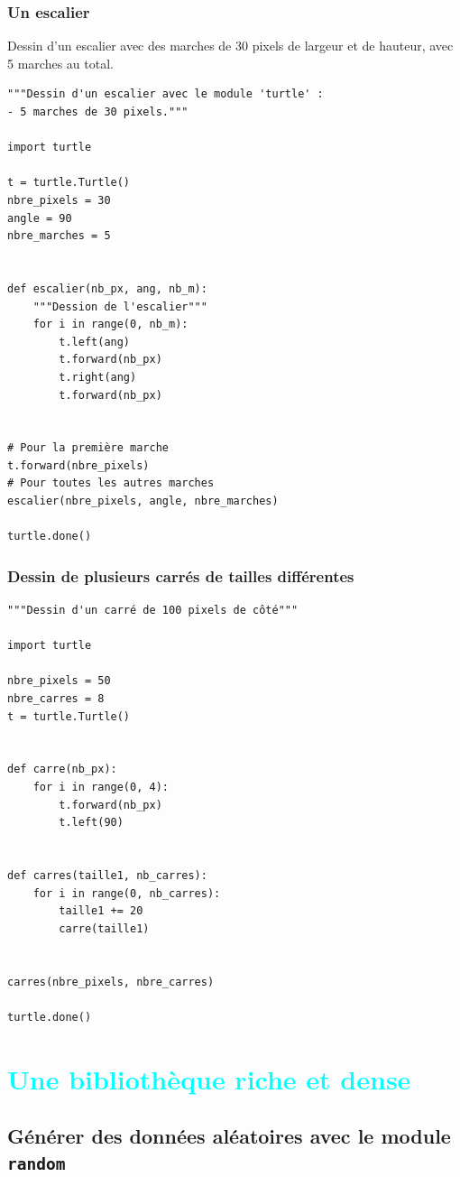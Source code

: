 \documentclass[a4paper,12pt]{book}
\begin{document}
\section{Un escalier}
Dessin d'un escalier avec des marches de 30 pixels de largeur et de hauteur, avec 5 marches au total.
\begin{lstlisting}
"""Dessin d'un escalier avec le module 'turtle' :
- 5 marches de 30 pixels."""

import turtle

t = turtle.Turtle()
nbre_pixels = 30
angle = 90
nbre_marches = 5


def escalier(nb_px, ang, nb_m):
    """Dession de l'escalier"""
    for i in range(0, nb_m):
        t.left(ang)
        t.forward(nb_px)
        t.right(ang)
        t.forward(nb_px)


# Pour la première marche
t.forward(nbre_pixels)
# Pour toutes les autres marches
escalier(nbre_pixels, angle, nbre_marches)

turtle.done()
\end{lstlisting}
\medskip

\section{Dessin de plusieurs carrés de tailles différentes}
\begin{lstlisting}
"""Dessin d'un carré de 100 pixels de côté"""

import turtle

nbre_pixels = 50
nbre_carres = 8
t = turtle.Turtle()


def carre(nb_px):
    for i in range(0, 4):
        t.forward(nb_px)
        t.left(90)


def carres(taille1, nb_carres):
    for i in range(0, nb_carres):
        taille1 += 20
        carre(taille1)


carres(nbre_pixels, nbre_carres)

turtle.done()
\end{lstlisting}
\medskip

\part{\textcolor{cyan}{Une bibliothèque riche et dense}}

\chapter{Générer des données aléatoires avec le module \texttt{random}}
\end{document}
